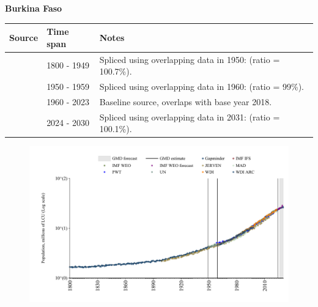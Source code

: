 \documentclass[12pt,a4paper,landscape]{article}
\begin{document}
\begin{adjustbox}{max totalsize={\paperwidth}{\paperheight},center}
\begin{minipage}[t][\textheight][t]{\textwidth}
\vspace*{0.5cm}
{}
\begin{center}
{\Large\bfseries Burkina Faso}
\end{center}
\vspace{0.5cm}
\begin{table}[H]
\centering
\small
\begin{tabular}{|l|l|l|}
\hline
\textbf{Source} & \textbf{Time span} & \textbf{Notes} \\
\hline
\rowcolor{white}\cite{Gapminder}& 1800 - 1949 &Spliced using overlapping data in 1950: (ratio = 100.7\%).\\
\rowcolor{lightgray}\cite{IMF_IFS}& 1950 - 1959 &Spliced using overlapping data in 1960: (ratio = 99\%).\\
\rowcolor{white}\cite{WDI}& 1960 - 2023 &Baseline source, overlaps with base year 2018.\\
\rowcolor{lightgray}\cite{Gapminder}& 2024 - 2030 &Spliced using overlapping data in 2031: (ratio = 100.1\%).\\
\hline
\end{tabular}
\end{table}
\begin{figure}[H]
\centering
\includegraphics[width=\textwidth,height=0.6\textheight,keepaspectratio]{graphs/BFA_pop.pdf}
\end{figure}
\end{minipage}
\end{adjustbox}
\end{document}
